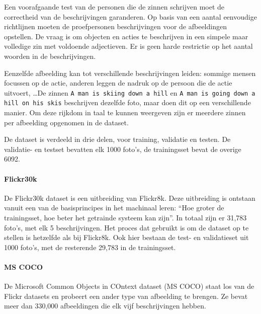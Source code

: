 Een voorafgaande test van de personen die de zinnen schrijven moet de correctheid van de beschrijvingen garanderen. Op basis van een aantal eenvoudige richtlijnen moeten de proefpersonen beschrijvingen voor de afbeeldingen opstellen. De vraag is om objecten en acties te beschrijven in een simpele maar volledige zin met voldoende adjectieven. Er is geen harde restrictie op het aantal woorden in de beschrijvingen\~\cite{Hockenmaier2014}.

Eenzelfde afbeelding kan tot verschillende beschrijvingen leiden: sommige mensen focussen op de actie, anderen leggen de nadruk op de persoon die de actie uitvoert, \ldots De zinnen \texttt{A man is skiing down a hill} en \texttt{A man is going down a hill on his skis} beschrijven dezelfde foto, maar doen dit op een verschillende manier. Om deze rijkdom in taal te kunnen weergeven zijn er meerdere zinnen per afbeelding opgenomen in de dataset.

De dataset is verdeeld in drie delen, voor training, validatie en testen. De validatie- en testset bevatten elk 1000 foto's, de trainingsset bevat de overige 6092.


\paragraph{Flickr30k}
\label{par:Flickr30k}
De Flickr30k dataset\cite{Young2014} is een uitbreiding van Flickr8k. Deze uitbreiding is ontstaan vanuit een van de basisprincipes in het machinaal leren: ``Hoe groter de trainingsset, hoe beter het getrainde systeem kan zijn''. In totaal zijn er 31,783 foto's, met elk 5 beschrijvingen. Het proces dat gebruikt is om de dataset op te stellen is hetzelfde als bij Flickr8k. Ook hier bestaan de test- en validatieset uit 1000 foto's, met de resterende 29,783 in de trainingsset.


\paragraph{MS COCO}
\label{par:MS COCO}
De Microsoft Common Objects in COntext dataset (MS COCO)\cite{Lin2014} staat los van de Flickr datasets en probeert een ander type van afbeelding te brengen. Ze bevat meer dan 330,000 afbeeldingen die elk vijf beschrijvingen hebben. 

